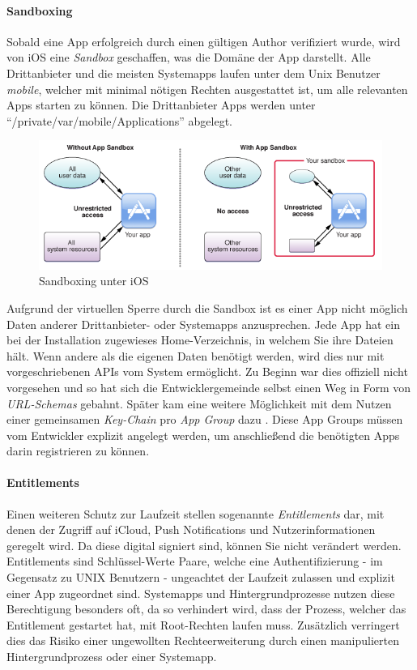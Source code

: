 		\paragraph{Sandboxing}\label{sec:sandboxing}
			Sobald eine App erfolgreich durch einen gültigen Author verifiziert wurde,
			wird von iOS eine \textsl{Sandbox} geschaffen, was die Domäne der App
			darstellt. Alle Drittanbieter und die meisten Systemapps laufen unter dem
			Unix Benutzer \textsl{mobile}, welcher mit minimal nötigen Rechten
			ausgestattet ist, um alle relevanten Apps starten zu können. Die
			Drittanbieter Apps werden unter "`/private/var/mobile/Applications"'
			abgelegt.
			\begin{figure}[h]
				\centering
				\includegraphics[width=0.9\linewidth]{ios/media/sandboxing.png}
				\caption{Sandboxing unter iOS 
				\cite{IOSSandboxing}}
				\label{fig:sandboxing}
			\end{figure}
			Aufgrund der virtuellen Sperre durch die Sandbox ist es einer App nicht
			möglich Daten anderer Drittanbieter- oder Systemapps anzusprechen. Jede App
			hat ein bei der Installation zugewieses Home-Verzeichnis, in
			welchem Sie ihre Dateien hält. Wenn andere als die eigenen Daten benötigt
			werden, wird dies nur mit vorgeschriebenen APIs vom System ermöglicht. Zu
			Beginn war dies offiziell nicht vorgesehen und so hat sich die
			Entwicklergemeinde selbst einen Weg in Form von \textsl{URL-Schemas}
			gebahnt. Später kam eine weitere Möglichkeit mit dem Nutzen einer
			gemeinsamen \textsl{Key-Chain} pro \textsl{App Group}
			dazu \cite[S. 83]{Banks2015}. Diese App Groups müssen vom Entwickler explizit
			angelegt werden, um anschließend die benötigten Apps darin registrieren zu
			können.
				
		\paragraph{Entitlements}
			Einen weiteren Schutz zur Laufzeit stellen sogenannte \textsl{Entitlements}
			dar, mit denen der Zugriff auf iCloud, Push	Notifications und
			Nutzerinformationen geregelt wird. Da diese digital signiert sind, können Sie
			nicht verändert werden. Entitlements sind Schlüssel-Werte Paare, welche eine
			Authentifizierung - im Gegensatz zu UNIX Benutzern - ungeachtet der Laufzeit
			zulassen und explizit einer App zugeordnet sind.
			Systemapps und Hintergrundprozesse nutzen diese Berechtigung besonders oft,
			da so verhindert wird, dass der Prozess, welcher das Entitlement gestartet
			hat, mit Root-Rechten laufen muss.
			Zusätzlich verringert dies das Risiko einer ungewollten Rechteerweiterung
			durch einen manipulierten Hintergrundprozess oder einer Systemapp.
		
